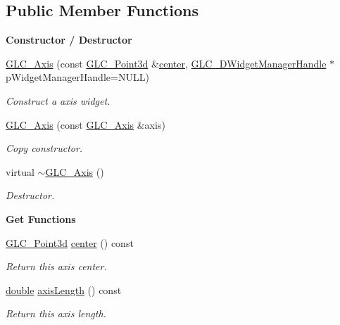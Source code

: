 \subsection*{Public Member Functions}
\begin{Indent}{\bf Constructor / Destructor}\par
\begin{DoxyCompactItemize}
\item 
\hyperlink{class_g_l_c___axis_ae52519963d94b2f507bd86823acbf2c7}{G\-L\-C\-\_\-\-Axis} (const \hyperlink{glc__vector3d_8h_a4e13a9bbc7ab3d34de7e98b41836772c}{G\-L\-C\-\_\-\-Point3d} \&\hyperlink{class_g_l_c___axis_a0af97f983a6ee4e52822091726aff1e2}{center}, \hyperlink{class_g_l_c__3_d_widget_manager_handle}{G\-L\-C\-\_\-D\-Widget\-Manager\-Handle} $\ast$p\-Widget\-Manager\-Handle=N\-U\-L\-L)
\begin{DoxyCompactList}\small\item\em Construct a axis widget. \end{DoxyCompactList}\item 
\hyperlink{class_g_l_c___axis_ad0289225936e620d3deec3a0046ed8ff}{G\-L\-C\-\_\-\-Axis} (const \hyperlink{class_g_l_c___axis}{G\-L\-C\-\_\-\-Axis} \&axis)
\begin{DoxyCompactList}\small\item\em Copy constructor. \end{DoxyCompactList}\item 
virtual \hyperlink{class_g_l_c___axis_a551ac239c35e72354981362376e4613c}{$\sim$\-G\-L\-C\-\_\-\-Axis} ()
\begin{DoxyCompactList}\small\item\em Destructor. \end{DoxyCompactList}\end{DoxyCompactItemize}
\end{Indent}
\begin{Indent}{\bf Get Functions}\par
\begin{DoxyCompactItemize}
\item 
\hyperlink{glc__vector3d_8h_a4e13a9bbc7ab3d34de7e98b41836772c}{G\-L\-C\-\_\-\-Point3d} \hyperlink{class_g_l_c___axis_a0af97f983a6ee4e52822091726aff1e2}{center} () const 
\begin{DoxyCompactList}\small\item\em Return this axis center. \end{DoxyCompactList}\item 
\hyperlink{_super_l_u_support_8h_a8956b2b9f49bf918deed98379d159ca7}{double} \hyperlink{class_g_l_c___axis_a984fbadbaa8877600de2d4692a97c787}{axis\-Length} () const 
\begin{DoxyCompactList}\small\item\em Return this axis length. \end{DoxyCompactList}\end{DoxyCompactItemize}
\end{Indent}
